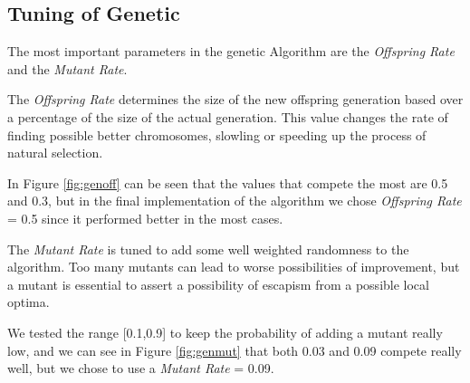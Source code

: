 


\subsection{Tuning of Genetic}

The most important parameters in the genetic Algorithm are the \textit{Offspring Rate} and the \textit{Mutant Rate}.

The \textit{Offspring Rate} determines the size of the new offspring generation based over a percentage of the size of the actual generation. This value changes the rate of finding possible better chromosomes, slowling or speeding up the process of natural selection.

In Figure \ref{fig:genoff} can be seen that the values that compete the most are 0.5 and 0.3, but in the final implementation of the algorithm we chose \textit{Offspring Rate} = 0.5 since it performed better in the most cases.


The \textit{Mutant Rate} is tuned to add some well weighted randomness to the algorithm. Too many mutants can lead to worse possibilities of improvement, but a mutant is essential to assert a possibility of escapism from a possible local optima. 

We tested the range [0.1,0.9] to keep the probability of adding a mutant really low, and we can see in Figure \ref{fig:genmut} that both 0.03 and 0.09 compete really well, but we chose to use a \textit{Mutant Rate} = 0.09.

